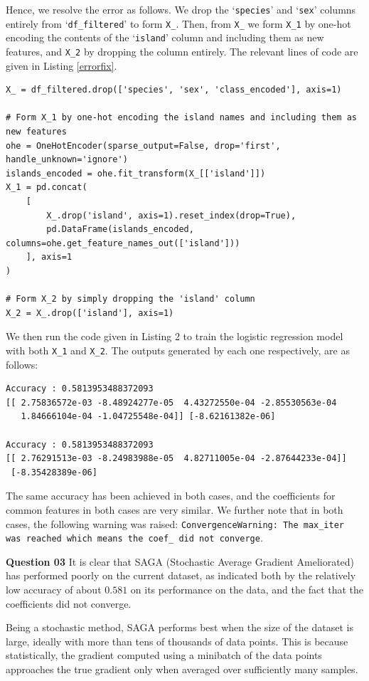 \documentclass{article}[a4paper]
\begin{document}
	Hence, we resolve the error as follows. We drop the `\texttt{species}' and `\texttt{sex}' columns entirely from `\texttt{df\_filtered}' to form \texttt{X\_}. Then, from \texttt{X\_} we form \texttt{X\_1} by one-hot encoding the contents of the `\texttt{island}' column and including them as new features, and \texttt{X\_2} by dropping the column entirely. The relevant lines of code are given in Listing \ref{errorfix}.

	\begin{lstlisting}[caption={Fix for the error}, label=errorfix]
X_ = df_filtered.drop(['species', 'sex', 'class_encoded'], axis=1)

# Form X_1 by one-hot encoding the island names and including them as new features
ohe = OneHotEncoder(sparse_output=False, drop='first', handle_unknown='ignore')
islands_encoded = ohe.fit_transform(X_[['island']])
X_1 = pd.concat(
    [
        X_.drop('island', axis=1).reset_index(drop=True),
        pd.DataFrame(islands_encoded, columns=ohe.get_feature_names_out(['island']))
    ], axis=1
)

# Form X_2 by simply dropping the 'island' column
X_2 = X_.drop(['island'], axis=1)
	\end{lstlisting}

	We then run the code given in Listing 2 to train the logistic regression model with both \texttt{X\_1} and \texttt{X\_2}. The outputs generated by each one respectively, are as follows:
	\begin{verbatim}
Accuracy : 0.5813953488372093
[[ 2.75836572e-03 -8.48924277e-05  4.43272550e-04 -2.85530563e-04
   1.84666104e-04 -1.04725548e-04]] [-8.62161382e-06]

Accuracy : 0.5813953488372093
[[ 2.76291513e-03 -8.24983988e-05  4.82711005e-04 -2.87644233e-04]]
 [-8.35428389e-06]
\end{verbatim}
	The same accuracy has been achieved in both cases, and the coefficients for common features in both cases are very similar. We further note that in both cases, the following warning was raised: \texttt{ConvergenceWarning: The max\_iter was reached which means the coef\_ did not converge}.
	\medskip

	\textbf{Question 03} It is clear that SAGA (Stochastic Average Gradient Ameliorated) has performed poorly on the current dataset, as indicated both by the relatively low accuracy of about $0.581$ on its performance on the data, and the fact that the coefficients did not converge.

	Being a stochastic method, SAGA performs best when the size of the dataset is large, ideally with more than tens of thousands of data points. This is because statistically, the gradient computed using a minibatch of the data points approaches the true gradient only when averaged over sufficiently many samples.
\end{document}
